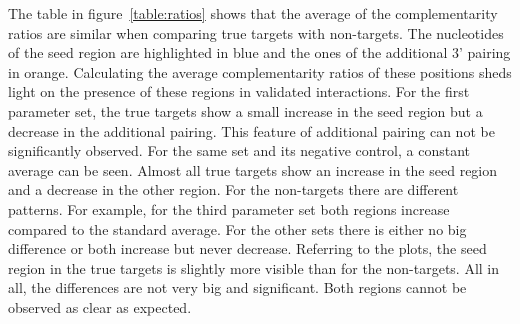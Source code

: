 \documentclass[12pt,  a4paper]{report}
\begin{document}
The table in figure~\ref{table:ratios} shows that the average of the complementarity ratios are similar when comparing true targets with non-targets. The nucleotides of the seed region are highlighted in blue and the ones of the additional 3' pairing in orange. Calculating the average complementarity ratios of these positions sheds light on the presence of these regions in validated interactions. For the first parameter set, the true targets show a small increase in the seed region but a decrease in the additional pairing. This feature of additional pairing can not be significantly observed. For the same set and its negative control, a constant average can be seen. Almost all true targets show an increase in the seed region and a decrease in the other region. For the non-targets there are different patterns. For example, for the third parameter set both regions increase compared to the standard average. For the other sets there is either no big difference or both increase but never decrease. Referring to the plots, the seed region in the true targets is slightly more visible than for the non-targets. All in all, the differences are not very big and significant. Both regions cannot be observed as clear as expected.  \\
\end{document}
